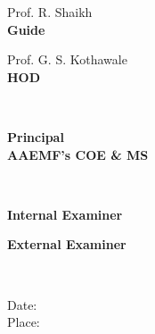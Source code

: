 \vfill

\begin{center}
\parbox[t][][b]{0.5\textwidth}{\flushleft Prof. R. Shaikh\\\textbf{\hspace*{0.9cm}Guide}}\parbox[t][][b]{0.5\textwidth}{\flushright Prof. G. S. Kothawale\\\textbf{HOD\hspace*{1.6cm}}}\\[1.0cm] %

\parbox[t][][b]{\textwidth}{\centering \textbf{Principal}\\\textbf{AAEMF's COE \& MS}}\\[1.0cm] %

\parbox[t][][b]{0.5\textwidth}{\flushleft \textbf{Internal Examiner}\\}\parbox[t][][b]{0.5\textwidth}{\flushright \textbf{External Examiner}}\\ %
\end{center}

\begin{flushleft}
Date:\\
Place:
\end{flushleft}
